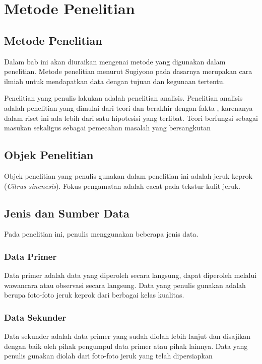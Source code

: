 \documentclass[laporan.tex]{subfiles}
\begin{document}
\chapter{Metode Penelitian}

\section{Metode Penelitian}

Dalam bab ini akan diuraikan mengenai metode yang digunakan dalam penelitian. Metode penelitian menurut Sugiyono pada dasarnya merupakan cara ilmiah untuk mendapatkan data dengan tujuan dan kegunaan tertentu.

Penelitian yang penulis lakukan adalah penelitian analisis. Penelitian analisis adalah penelitian yang dimulai dari teori dan berakhir dengan fakta , karenanya dalam riset ini ada lebih dari satu hipotesisi yang terlibat. Teori berfungsi sebagai masukan sekaligus sebagai pemecahan masalah yang bersangkutan

\section{Objek Penelitian}

Objek penelitian yang penulis gunakan dalam penelitian ini adalah jeruk keprok (\emph{Citrus sinenesis}). Fokus pengamatan adalah cacat pada tekstur kulit jeruk.

\section{Jenis dan Sumber Data}

Pada penelitian ini, penulis menggunakan beberapa jenis data.

\subsection{Data Primer}

Data primer adalah data yang diperoleh secara langsung, dapat diperoleh melalui wawancara atau observasi secara langsung. Data yang penulis gunakan adalah berupa foto-foto jeruk keprok dari berbagai kelas kualitas.

\subsection{Data Sekunder}

Data sekunder adalah data primer yang sudah diolah lebih lanjut dan disajikan dengan baik oleh pihak pengumpul data primer atau pihak lainnya. Data yang penulis gunakan diolah dari foto-foto jeruk yang telah dipersiapkan
\end{document}
